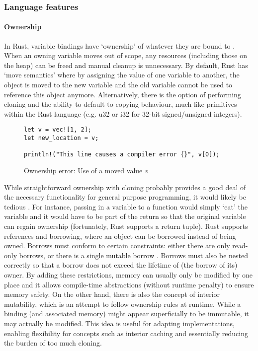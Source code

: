\subsubsection{Language features}

\paragraph{Ownership}

In Rust, variable bindings have `ownership' of whatever they are bound to \cite{docowner15}\cite{rustbook15}. When an owning variable moves out of scope, any resources (including those on the heap) can be freed and manual cleanup is unnecessary. By default, Rust has `move semantics' where by assigning the value of one variable to another, the object is moved to the new variable and the old variable cannot be used to reference this object anymore. Alternatively, there is the option of performing cloning and the ability to default to copying behaviour, much like primitives within the Rust language (e.g. u32 or i32 for 32-bit signed/unsigned integers).

\begin{figure}[H]
\centering
\begin{verbatim}
let v = vec![1, 2];
let new_location = v;

println!("This line causes a compiler error {}", v[0]);
\end{verbatim}
\caption{Ownership error: Use of a moved value \emph{v}}
\end{figure}

While straightforward ownership with cloning probably provides a good deal of the necessary functionality for general purpose programming, it would likely be tedious \cite{docowner15}. For instance, passing in a variable to a function would simply `eat' the variable and it would have to be part of the return so that the original variable can regain ownership (fortunately, Rust supports a return tuple). Rust supports references and borrowing, where an object can be borrowed instead of being owned. Borrows must conform to certain constraints: either there are only read-only borrows, or there is a single mutable borrow \cite{docborrow15}. Borrows must also be nested correctly so that a borrow does not exceed the lifetime of (the borrow of its) owner. By adding these restrictions, memory can usually only be modified by one place and it allows compile-time abstractions (without runtime penalty) to ensure memory safety. On the other hand, there is also the concept of interior mutability, which is an attempt to follow ownership rules at runtime. While a binding (and associated memory) might appear superficially to be immutable, it may actually be modified. This idea is useful for adapting implementations, enabling flexibility for concepts such as interior caching and essentially reducing the burden of too much cloning.

